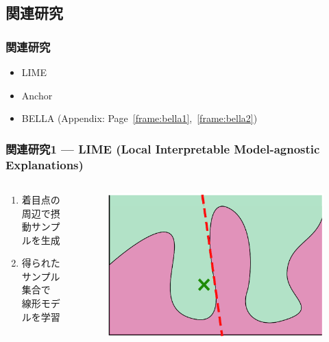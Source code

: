 \documentclass[aspectratio=169]{slide-ja}
\begin{document}
\subsection{関連研究}

\begin{frame}
  \frametitle{関連研究}
  \begin{itemize}
    \item LIME
    \item Anchor
    \item BELLA
          (Appendix: Page~\ref{frame:bella1},~\ref{frame:bella2})
  \end{itemize}
\end{frame}

\begin{frame}
  \frametitle{%
    関連研究1 — LIME
    \small{(Local Interpretable Model-agnostic Explanations)}
  }
  \begin{columns}[]
    \begin{column}{0.5\textwidth}
      \begin{enumerate}
        \item 着目点の周辺で摂動サンプルを生成
        \item 得られたサンプル集合で\\線形モデルを学習
      \end{enumerate}
    \end{column}
    \begin{column}{0.5\textwidth}
      \begin{figure}
        \includegraphics[scale=0.35]{visual-lime}
      \end{figure}
    \end{column}
  \end{columns}
\end{frame}
\end{document}
